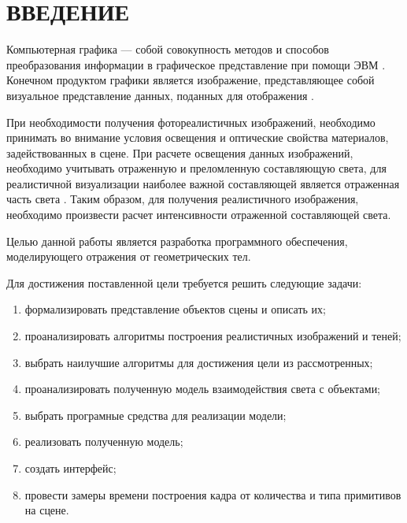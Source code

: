 \chapter*{ВВЕДЕНИЕ}


Компьютерная графика --- собой совокупность методов и способов преобразования информации в графическое представление при помощи ЭВМ \cite{compgraph_importance}.
Конечном продуктом графики является изображение, представляющее собой визуальное представление данных, поданных для отображения \cite{Rodgers}. 

При необходимости получения фотореалистичных изображений, необходимо принимать во внимание условия освещения и оптические свойства материалов, задействованных в сцене. При расчете освещения данных изображений, необходимо учитывать отраженную  и преломленную составляющую света, для реалистичной визуализации наиболее важной составляющей является отраженная часть света \cite{compgraph_usage,real_images}. Таким образом, для получения реалистичного изображения, необходимо произвести расчет интенсивности отраженной составляющей света.


Целью данной работы является разработка программного обеспечения, моделирующего отражения от геометрических тел.

Для достижения поставленной цели требуется решить следующие задачи:
\begin{enumerate}
	\item формализировать представление объектов сцены и описать их;
	\item проанализировать алгоритмы построения реалистичных изображений и теней;
	\item выбрать наилучшие алгоритмы для достижения цели  из рассмотренных;
	\item проанализировать полученную  модель взаимодействия света с объектами;
	\item выбрать програмные средства для реализации модели;
	\item реализовать полученную модель;
	\item создать интерфейс;
	\item провести замеры времени построения кадра от количества и типа примитивов на сцене.
\end{enumerate}
